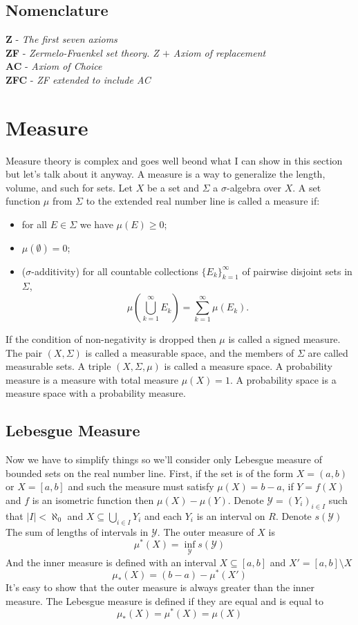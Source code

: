\documentclass[11pt,a4paper]{article}
\begin{document}
\subsection{Nomenclature}
	\textbf{Z} - \emph{The first seven axioms} \\
	\textbf{ZF} - \emph{Zermelo-Fraenkel set theory. 
	Z $+$ Axiom of replacement}\\
    \textbf{AC} - \emph{Axiom of Choice} \\
    \textbf{ZFC} - \emph{ZF extended to include AC}
    
\newpage

\section{Measure}
Measure theory is complex and goes well beond what I can show in this 
section but let's talk about it anyway. A measure is a way to generalize 
the length, volume, and such for sets. 
Let $X$ be a set and $\Sigma$ a $\sigma$-algebra over $X$. 
A set function $\mu$ from $\Sigma$ to the extended real number line is 
called a measure if:
\begin{itemize}
\item for all $E \in \Sigma$ we have $\mu(E) \ge 0$;
\item $\mu(\emptyset) = 0$;
\item ($\sigma$-additivity) 
  for all countable collections $\{E_k\}_{k=1}^\infty$ of pairwise 
  disjoint sets in $\Sigma$,
\[
	\mu\left(\bigcup_{k=1}^\infty{E_k}\right)=\sum_{k=1}^\infty{\mu(E_k)}.
\]
\end{itemize}
If the condition of non-negativity is dropped then $\mu$ is called a 
signed measure. The pair $(X,\Sigma)$ is called a measurable space, 
and the members of $\Sigma$ are called measurable sets. 
A triple $(X,\Sigma,\mu)$ is called a measure space. 
A probability measure is a measure with total measure $\mu(X)=1$. 
A probability space is a measure space with a probability measure.
\subsection{Lebesgue Measure}
Now we have to simplify things so we'll consider only Lebesgue measure of 
bounded sets on the real number line. 
First, if the set is of the form $X=(a,b)$ or $X=[a,b]$ and such 
the measure must satisfy $\mu(X)=b-a$, if $Y=f(X)$ and $f$ is an 
isometric function then $\mu(X)-\mu(Y)$. 
Denote $\mathcal{Y}=(Y_i)_{i\in I}$ such that $|I|<\aleph_0$ and 
$X\subseteq \bigcup_{i\in I}{Y_i}$ and each $Y_i$ is an interval on $R$.
Denote $s(\mathcal{Y})$ The sum of lengths of intervals in $\mathcal{Y}$. 
The outer measure of $X$ is
\[
	\mu^*(X) = \inf_{\mathcal{Y}}s(\mathcal{Y})
\]
And the inner measure is defined with an interval $X\subseteq[a,b]$ 
and $X'=[a,b]\setminus X$
\[
	\mu_*(X) = (b-a)- \mu^*(X')
\]
It's easy to show that the outer measure is always greater than the inner
measure. The Lebesgue measure is defined if they are equal and is equal to
\[
	\mu_*(X)=\mu^*(X)=\mu(X)
\]
\end{document}
